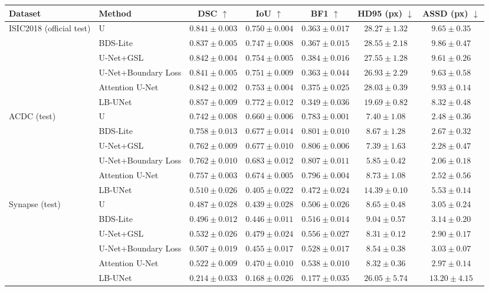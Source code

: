 \begin{tabular}{llccccc}
\toprule
Dataset & Method & DSC $\uparrow$ & IoU $\uparrow$ & BF1 $\uparrow$ & HD95 (px) $\downarrow$ & ASSD (px) $\downarrow$ \\
\midrule
ISIC2018 (official test) & U & $0.841 \pm 0.003$ & $0.750 \pm 0.004$ & $0.363 \pm 0.017$ & $28.27 \pm 1.32$ & $9.65 \pm 0.35$ \\
 & BDS-Lite & $0.837 \pm 0.005$ & $0.747 \pm 0.008$ & $0.367 \pm 0.015$ & $28.55 \pm 2.18$ & $9.86 \pm 0.47$ \\
 & U-Net+GSL & $0.842 \pm 0.004$ & $0.754 \pm 0.005$ & $0.384 \pm 0.016$ & $27.55 \pm 1.28$ & $9.61 \pm 0.26$ \\
 & U-Net+Boundary Loss & $0.841 \pm 0.005$ & $0.751 \pm 0.009$ & $0.363 \pm 0.044$ & $26.93 \pm 2.29$ & $9.63 \pm 0.58$ \\
 & Attention U-Net & $0.842 \pm 0.002$ & $0.753 \pm 0.004$ & $0.375 \pm 0.025$ & $28.03 \pm 0.39$ & $9.93 \pm 0.14$ \\
 & LB-UNet & $0.857 \pm 0.009$ & $0.772 \pm 0.012$ & $0.349 \pm 0.036$ & $19.69 \pm 0.82$ & $8.32 \pm 0.48$ \\
\midrule
ACDC (test) & U & $0.742 \pm 0.008$ & $0.660 \pm 0.006$ & $0.783 \pm 0.001$ & $7.40 \pm 1.08$ & $2.48 \pm 0.36$ \\
 & BDS-Lite & $0.758 \pm 0.013$ & $0.677 \pm 0.014$ & $0.801 \pm 0.010$ & $8.67 \pm 1.28$ & $2.67 \pm 0.32$ \\
 & U-Net+GSL & $0.762 \pm 0.009$ & $0.677 \pm 0.010$ & $0.806 \pm 0.006$ & $7.39 \pm 1.63$ & $2.28 \pm 0.47$ \\
 & U-Net+Boundary Loss & $0.762 \pm 0.010$ & $0.683 \pm 0.012$ & $0.807 \pm 0.011$ & $5.85 \pm 0.42$ & $2.06 \pm 0.18$ \\
 & Attention U-Net & $0.757 \pm 0.003$ & $0.674 \pm 0.005$ & $0.796 \pm 0.004$ & $8.73 \pm 1.08$ & $2.52 \pm 0.56$ \\
 & LB-UNet & $0.510 \pm 0.026$ & $0.405 \pm 0.022$ & $0.472 \pm 0.024$ & $14.39 \pm 0.10$ & $5.53 \pm 0.14$ \\
\midrule
Synapse (test) & U & $0.487 \pm 0.028$ & $0.439 \pm 0.028$ & $0.506 \pm 0.026$ & $8.65 \pm 0.48$ & $3.05 \pm 0.24$ \\
 & BDS-Lite & $0.496 \pm 0.012$ & $0.446 \pm 0.011$ & $0.516 \pm 0.014$ & $9.04 \pm 0.57$ & $3.14 \pm 0.20$ \\
 & U-Net+GSL & $0.532 \pm 0.026$ & $0.479 \pm 0.024$ & $0.556 \pm 0.027$ & $8.31 \pm 0.12$ & $2.90 \pm 0.17$ \\
 & U-Net+Boundary Loss & $0.507 \pm 0.019$ & $0.455 \pm 0.017$ & $0.528 \pm 0.017$ & $8.54 \pm 0.38$ & $3.03 \pm 0.07$ \\
 & Attention U-Net & $0.522 \pm 0.009$ & $0.470 \pm 0.010$ & $0.538 \pm 0.010$ & $8.32 \pm 0.36$ & $2.97 \pm 0.14$ \\
 & LB-UNet & $0.214 \pm 0.033$ & $0.168 \pm 0.026$ & $0.177 \pm 0.035$ & $26.05 \pm 5.74$ & $13.20 \pm 4.15$ \\
\bottomrule
\end{tabular}
